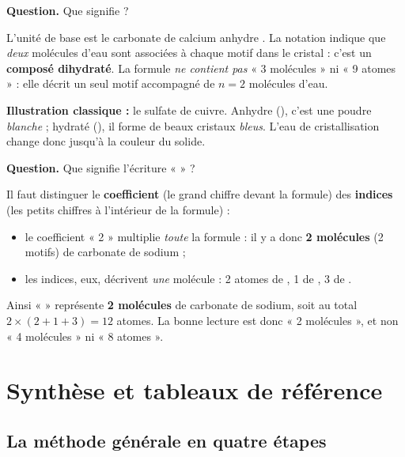 \documentclass[11pt,a4paper]{article}
\begin{document}
\begin{exemple}
\textbf{Question.} Que signifie  ?

\smallskip
L'unité de base est le carbonate de calcium anhydre . La notation  indique que
\emph{deux} molécules d'eau sont associées à chaque motif  dans le cristal : c'est un
\textbf{composé dihydraté}. La formule \emph{ne contient pas} « 3 molécules » ni « 9 atomes » : elle
décrit un seul motif  accompagné de $n = 2$ molécules d'eau.

\smallskip
\textbf{Illustration classique :} le sulfate de cuivre. Anhydre (), c'est une poudre
\emph{blanche} ; hydraté (), il forme de beaux cristaux \emph{bleus}. L'eau de
cristallisation change donc jusqu'à la couleur du solide.
\end{exemple}

\begin{exemple}
\textbf{Question.} Que signifie l'écriture «  » ?

\smallskip
Il faut distinguer le \textbf{coefficient} (le grand chiffre devant la formule) des \textbf{indices}
(les petits chiffres à l'intérieur de la formule) :
\begin{itemize}[leftmargin=1.6em,topsep=2pt,itemsep=1pt]
  \item le coefficient « 2 » multiplie \emph{toute} la formule : il y a donc \textbf{2 molécules}
        (2 motifs) de carbonate de sodium ;
  \item les indices, eux, décrivent \emph{une} molécule  : 2 atomes de , 1 de ,
        3 de .
\end{itemize}
Ainsi «  » représente \textbf{2 molécules} de carbonate de sodium, soit au total
$2\times(2+1+3) = 12$ atomes. La bonne lecture est donc « 2 molécules », et non « 4 molécules » ni
« 8 atomes ».
\end{exemple}

\section{Synthèse et tableaux de référence}
\subsection{La méthode générale en quatre étapes}
\end{document}
